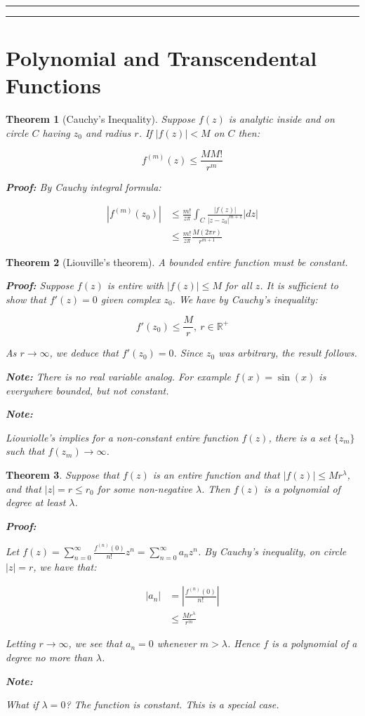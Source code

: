 \documentclass{article}
\newtheorem{theorem}{Theorem}[section]
\theoremstyle{definition}
\newcommand{\Section}[1]{\hrule\hrule\section{#1}}
\def\R{\mathbb{R}}
\begin{document}

\Section{Polynomial and Transcendental Functions }
\begin{theorem}[Cauchy's Inequality]
Suppose $f(z)$ is analytic inside and on circle $C$ having $z_0$ and radius $r$. If $|f(z)|<M$ on $C$ then:

$$f^{(m)}(z) \leq \frac{MM!}{r^m}$$

\textbf{Proof:}
By Cauchy integral formula:

\begin{align}
\left|f^{(m)}(z_0)\right| &\leq \frac{m!}{z\pi} \int_{C} \frac{|f(z)|}{|z-z_0|^{m+1}} |dz| \\ 
& \leq \frac{m!}{z\pi}\frac{M(2\pi r)}{r^{m+1}}
\end{align}
\end{theorem}

\begin{theorem}[Liouville's theorem]
A bounded entire function must be constant.

\textbf{Proof:}
Suppose $f(z)$ is entire with $|f(z)| \leq M$ for all $z$. It is sufficient to show that $f'(z) = 0$ given complex $z_0$. We have by Cauchy's inequality:

$$f'(z_0) \leq \frac{M}{r},\ r \in \R^+$$

As $r \to \infty$, we deduce that $f'(z_0) = 0$. Since $z_0$ was arbitrary, the result follows.

\textbf{Note:}
There is no real variable analog. For example $f(x) = \sin(x)$ is everywhere bounded, but not constant. 

\textbf{Note:}

Liouviolle's implies for a non-constant entire function $f(z)$, there is a set $\{z_m\}$ such that $f(z_m) \to \infty$. 


\end{theorem}

\begin{theorem}
Suppose that $f(z)$ is an entire function and that $|f(z)| \leq Mr^\lambda$, and that $|z| = r \leq r_0$ for some non-negative $\lambda$. Then $f(z)$ is a polynomial of degree at least $\lambda$. 

\textbf{Proof:}

Let $f(z) = \sum_{n=0}^\infty \frac{f^{(n)}(0)}{n!} z^n = \sum_{n=0}^\infty a_n z^n$. By Cauchy's inequality, on circle $|z|=r$, we have that:

\begin{align}
|a_n| &= \left|\frac{f^{(n)}(0)}{n!}\right| \\
& \leq \frac{Mr^\lambda}{r^m}
\end{align}

Letting $r \to \infty$, we see that $a_n = 0$ whenever $m>\lambda$. Hence $f$ is a polynomial of a degree no more than $\lambda$.

\textbf{Note:}

What if $\lambda = 0$? The function is constant. This is a special case.
\end{theorem}
\end{document}
